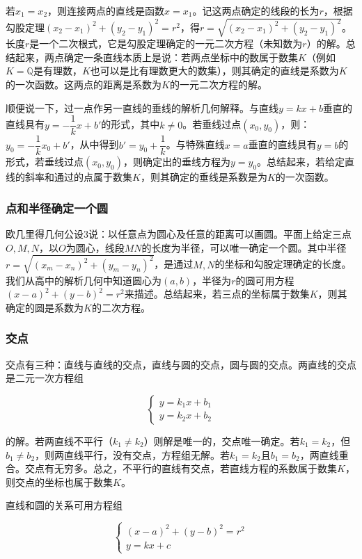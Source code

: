\documentclass[b5paper]{ctexart}
\begin{document}
若$x_1 = x_2$，则连接两点的直线是函数$x = x_1$。记这两点确定的线段的长为$r$，根据勾股定理$(x_2 - x_1)^2 + (y_2 - y_1)^2 = r^2$，得$r = \sqrt{(x_2 - x_1)^2 + (y_2 - y_1)^2}$。长度$r$是一个二次根式，它是勾股定理确定的一元二次方程（未知数为$r$）的解。总结起来，两点确定一条直线本质上是说：若两点坐标中的数属于数集$K$（例如$K = \mathbb{Q}$是有理数，$K$也可以是比有理数更大的数集），则其确定的直线是系数为$K$的一次函数。这两点的距离是系数为$K$的一元二次方程的解。

顺便说一下，过一点作另一直线的垂线的解析几何解释。与直线$y = kx + b$垂直的直线具有$y = -\dfrac{1}{k} x + b'$的形式，其中$k \ne 0$。若垂线过点$(x_0, y_0)$，则：$y_0 = -\dfrac{1}{k} x_0 + b'$，从中得到$b' = y_0 + \dfrac{1}{k}$。与特殊直线$x = a$垂直的直线具有$y = b$的形式，若垂线过点$(x_0, y_0)$，则确定出的垂线方程为$y = y_0$。总结起来，若给定直线的斜率和通过的点属于数集$K$，则其确定的垂线是系数是为$K$的一次函数。

\subsubsection{点和半径确定一个圆}

欧几里得几何公设3说：以任意点为圆心及任意的距离可以画圆。平面上给定三点$O, M, N$，以$O$为圆心，线段$MN$的长度为半径，可以唯一确定一个圆。其中半径$r = \sqrt{(x_m - x_n)^2 + (y_m - y_n)^2}$，是通过$M, N$的坐标和勾股定理确定的长度。我们从高中的解析几何中知道圆心为$(a, b)$，半径为$r$的圆可用方程$(x - a)^2 + (y - b)^2 = r^2$来描述。总结起来，若三点的坐标属于数集$K$，则其确定的圆是系数为$K$的二次方程。

\subsubsection{交点}
交点有三种：直线与直线的交点，直线与圆的交点，圆与圆的交点。两直线的交点是二元一次方程组

\[
\begin{cases}
y = k_1 x + b_1 \\
y = k_2 x + b_2
\end{cases}
\]

的解。若两直线不平行（$k_1 \ne k_2$）则解是唯一的，交点唯一确定。若$k_1 = k_2$，但$b_1 \ne b_2$，则两直线平行，没有交点，方程组无解。若$k_1 = k_2$且$b_1 = b_2$，两直线重合。交点有无穷多。总之，不平行的直线有交点，若直线方程的系数属于数集$K$，则交点的坐标也属于数集$K$。

直线和圆的关系可用方程组

\[
\begin{cases}
(x - a)^2 + (y - b)^2 = r^2 \\
y = kx + c
\end{cases}
\]
\end{document}
